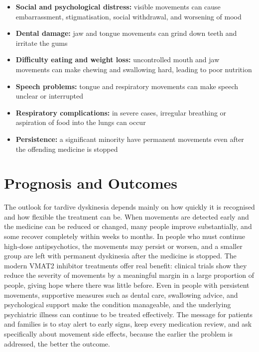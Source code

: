 \begin{itemize}
    \item \textbf{Social and psychological distress:} visible movements can cause embarrassment, stigmatisation, social withdrawal, and worsening of mood
    \item \textbf{Dental damage:} jaw and tongue movements can grind down teeth and irritate the gums
    \item \textbf{Difficulty eating and weight loss:} uncontrolled mouth and jaw movements can make chewing and swallowing hard, leading to poor nutrition
    \item \textbf{Speech problems:} tongue and respiratory movements can make speech unclear or interrupted
    \item \textbf{Respiratory complications:} in severe cases, irregular breathing or aspiration of food into the lungs can occur
    \item \textbf{Persistence:} a significant minority have permanent movements even after the offending medicine is stopped
\end{itemize}

\section*{Prognosis and Outcomes}
The outlook for tardive dyskinesia depends mainly on how quickly it is recognised and how flexible the treatment can be. When movements are detected early and the medicine can be reduced or changed, many people improve substantially, and some recover completely within weeks to months. In people who must continue high-dose antipsychotics, the movements may persist or worsen, and a smaller group are left with permanent dyskinesia after the medicine is stopped. The modern VMAT2 inhibitor treatments offer real benefit: clinical trials show they reduce the severity of movements by a meaningful margin in a large proportion of people, giving hope where there was little before. Even in people with persistent movements, supportive measures such as dental care, swallowing advice, and psychological support make the condition manageable, and the underlying psychiatric illness can continue to be treated effectively. The message for patients and families is to stay alert to early signs, keep every medication review, and ask specifically about movement side effects, because the earlier the problem is addressed, the better the outcome.

